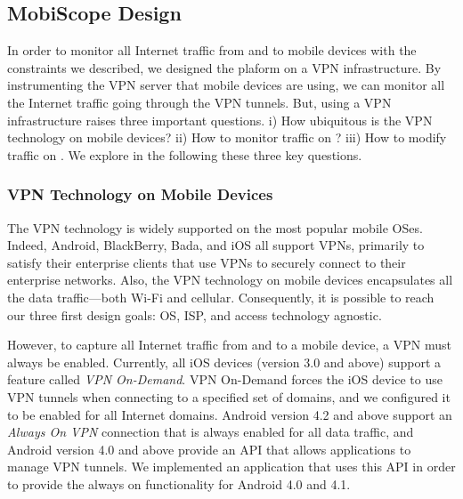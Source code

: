 \subsection{MobiScope Design}



In order to monitor all Internet traffic from and to mobile devices
with the constraints we described, we designed the \platname{} plaform
on a VPN infrastructure. By instrumenting the VPN server that
mobile devices are using, we can monitor all the Internet traffic going
through the VPN tunnels. But, using a VPN infrastructure raises three
important questions. i) How ubiquitous is the VPN technology on mobile
devices?  ii) How to monitor traffic on \platname{}? iii) How to
modify traffic on \platname. We explore in the following these three key questions.

\subsubsection{VPN Technology on Mobile Devices}
\label{sec:vpn-tech-mobile-device}
The VPN technology is widely supported on the most popular mobile
OSes. Indeed, Android, BlackBerry, Bada, and iOS all support VPNs,
primarily to satisfy their enterprise clients that use VPNs to
securely connect to their enterprise networks. Also, the VPN
technology on mobile devices encapsulates all the data traffic---both
Wi-Fi and cellular. Consequently, it is possible to reach our three
first design goals: OS, ISP, and access technology agnostic.

However, to capture all Internet traffic from and to a mobile device,
a VPN must always be enabled. Currently, all iOS devices (version 3.0
and above) support a feature called \textit{VPN On-Demand}.  VPN
On-Demand forces the iOS device to use VPN tunnels when connecting to
a specified set of domains, and we configured it to be enabled for all
Internet domains. Android version 4.2 and above support an
\textit{Always On VPN} connection that is always enabled for all data
traffic, and Android version 4.0 and above provide an API that allows
applications to manage VPN tunnels. We implemented an application that
uses this API in order to provide the always on functionality for
Android 4.0 and 4.1.


